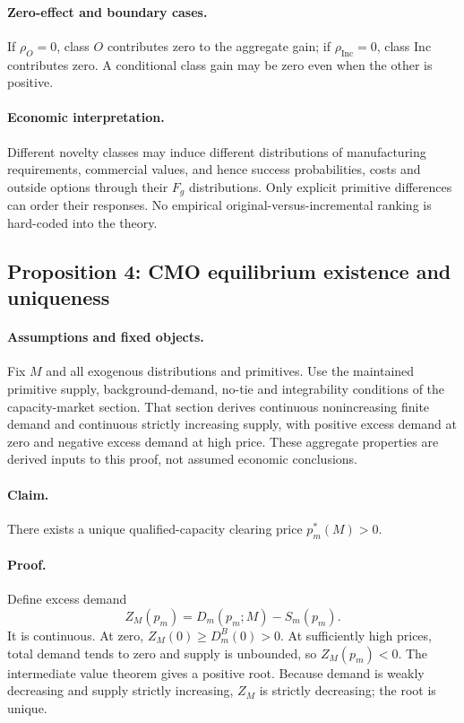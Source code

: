\paragraph{Zero-effect and boundary cases.}
If \(\rho_O=0\), class \(O\) contributes zero to the aggregate gain; if
\(\rho_{\mathrm{Inc}}=0\), class \(\mathrm{Inc}\) contributes zero. A
conditional class gain may be zero even when the other is positive.

\paragraph{Economic interpretation.}
Different novelty classes may induce different distributions of manufacturing
requirements, commercial values, and hence success probabilities, costs and
outside options through their \(F_g\) distributions. Only
explicit primitive differences can order their responses. No empirical
original-versus-incremental ranking is hard-coded into the theory.

\subsection{Proposition 4: CMO equilibrium existence and uniqueness}
\label{prop:p08-cmo-existence}

\paragraph{Assumptions and fixed objects.}
Fix \(M\) and all exogenous distributions and primitives. Use the maintained
primitive supply, background-demand, no-tie and integrability conditions
of the capacity-market section. That section derives continuous nonincreasing
finite demand and continuous strictly increasing supply, with positive excess
demand at zero and negative excess demand at high price. These aggregate
properties are derived inputs to this proof, not assumed economic conclusions.

\paragraph{Claim.}
There exists a unique qualified-capacity clearing price
\(p_m^*(M)>0\).

\paragraph{Proof.}
Define excess demand
\begin{equation}
  Z_M(p_m)
  =
  D_m(p_m;M)-S_m(p_m).
  \label{eq:p08-excess-demand}
\end{equation}
It is continuous. At zero,
\(Z_M(0)\geq D_m^B(0)>0\). At sufficiently high prices, total demand tends to
zero and supply is unbounded, so \(Z_M(p_m)<0\). The intermediate value
theorem gives a positive root. Because demand is weakly decreasing and supply
strictly increasing, \(Z_M\) is strictly decreasing; the root is unique.

